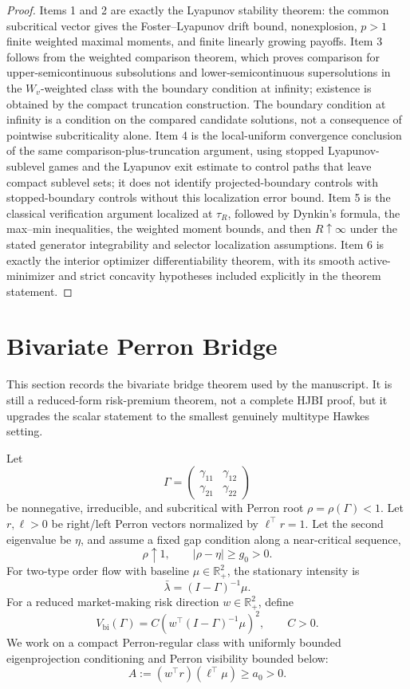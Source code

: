 \documentclass[11pt]{article}
\newcommand{\R}{\mathbb{R}}
\begin{document}
\begin{proof}
Items 1 and 2 are exactly the Lyapunov stability theorem: the common
subcritical vector gives the Foster--Lyapunov drift bound, nonexplosion,
$p>1$ finite weighted maximal moments, and finite linearly growing payoffs.
Item 3 follows from the weighted comparison theorem, which proves comparison for
upper-semicontinuous subsolutions and lower-semicontinuous supersolutions in
the $W_v$-weighted class with the boundary condition at infinity; existence is
obtained by the compact truncation construction. The boundary condition at
infinity is a condition on the compared candidate solutions, not a consequence
of pointwise subcriticality alone. Item 4 is the local-uniform convergence
conclusion of the same comparison-plus-truncation argument, using stopped
Lyapunov-sublevel games and the Lyapunov exit estimate to control paths that
leave compact sublevel sets; it does not identify projected-boundary controls
with stopped-boundary controls without this localization error bound. Item 5
is the classical verification argument localized at $\tau_R$, followed by
Dynkin's formula, the max--min inequalities, the weighted moment bounds, and
then $R\uparrow\infty$ under the stated generator integrability and selector
localization assumptions. Item 6 is exactly the interior optimizer
differentiability theorem, with its smooth active-minimizer and strict
concavity hypotheses included explicitly in the theorem statement.
\end{proof}

\section{Bivariate Perron Bridge}

This section records the bivariate bridge theorem used by the manuscript. It is
still a reduced-form risk-premium theorem, not a complete HJBI proof, but it
upgrades the scalar statement to the smallest genuinely multitype Hawkes
setting.

Let
\[
\Gamma =
\begin{pmatrix}
\gamma_{11} & \gamma_{12}\\
\gamma_{21} & \gamma_{22}
\end{pmatrix}
\]
be nonnegative, irreducible, and subcritical with Perron root
$\rho=\rho(\Gamma)<1$. Let $r,\ell>0$ be right/left Perron vectors normalized
by $\ell^\top r=1$. Let the second eigenvalue be $\eta$, and assume a fixed
gap condition along a near-critical sequence,
\[
\rho\uparrow1,\qquad |\rho-\eta|\ge g_0>0.
\]
For two-type order flow with baseline $\mu\in\R^2_+$, the stationary intensity
is
\[
\bar\lambda=(I-\Gamma)^{-1}\mu.
\]
For a reduced market-making risk direction $w\in\R^2_+$, define
\[
V_{\mathrm{bi}}(\Gamma)
 =
C\left(w^\top (I-\Gamma)^{-1}\mu\right)^2,
\qquad C>0.
\]
We work on a compact Perron-regular class with uniformly bounded eigenprojection
conditioning and Perron visibility bounded below:
\[
A:=(w^\top r)(\ell^\top\mu)\ge a_0>0.
\]
\end{document}
